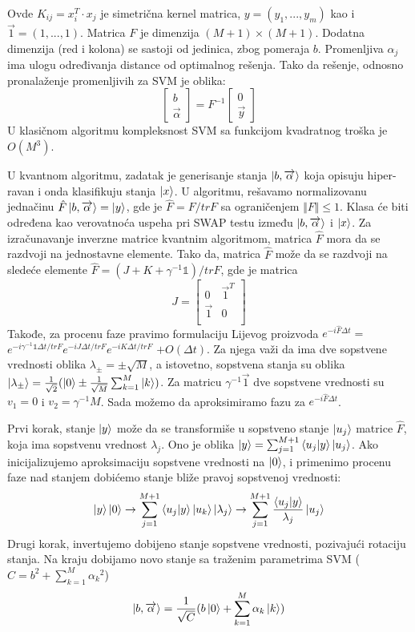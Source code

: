 \documentclass[12pt, letterpaper, oneside]{article}
\begin{document}
Ovde $K_{ij} = x_i^T \cdot x_j$ je simetrična kernel matrica, $y = (y_1,...,y_m)$ kao i
$\overrightarrow{1} = (1,...,1)$. Matrica $F$ je dimenzija $(M+1)\times(M+1)$. Dodatna dimenzija (red i kolona) se sastoji od jedinica,
zbog pomeraja $b$. Promenljiva $\alpha_j$ ima ulogu određivanja distance od optimalnog rešenja. Tako da rešenje, odnosno pronalaženje promenljivih za SVM je oblika:
\[
    \begin{bmatrix}
        b \\
        \overrightarrow{\alpha}
    \end{bmatrix} =
    F^{-1} \begin{bmatrix}
        0 \\
        \overrightarrow{y}
    \end{bmatrix}
\]
U klasičnom algoritmu kompleksnost SVM sa funkcijom kvadratnog troška je $O(M^3)$.

U kvantnom algoritmu, zadatak je generisanje stanja $\Ket{b,\overrightarrow{\alpha}}$ koja opisuju hiper-ravan i onda klasifikuju stanja
$\Ket{x}$. U algoritmu, rešavamo normalizovanu jednačinu $\hat{F}\Ket{b,\overrightarrow{\alpha}} = \Ket{y}$, gde je $\hat{F} = F/trF$ sa 
ograničenjem $\Vert F \Vert \leq 1$. Klasa će biti određena kao verovatnoća uspeha pri SWAP testu između $\Ket{b,\overrightarrow{\alpha}}$ i
$\Ket{x}$. Za izračunavanje inverzne matrice kvantnim algoritmom, matrica $\hat{F}$ mora da se razdvoji na jednostavne elemente.
Tako da, matrica $\hat{F}$ može da se razdvoji na sledeće elemente $\hat{F} = (J+K+\gamma^{-1}\mathbb{1})/trF$,
gde je matrica
\[
    J = \begin{bmatrix}
        0 & \overrightarrow{1}^T \\
        \overrightarrow{1} & 0 \\
    \end{bmatrix}
\]
Takođe, za procenu faze pravimo formulaciju Lijevog proizvoda 
$e^{-i\hat{F}\varDelta{t}} =$ $e^{-i\gamma^{-1}\mathbb{1}\varDelta{t}/trF}$$e^{-iJ\varDelta{t}/trF}$$e^{-iK\varDelta{t}/trF}$ $+ O(\varDelta{t})$.
Za njega važi da ima dve sopstvene vrednosti oblika $\lambda_{\pm} = \pm \sqrt{M}$, a istovetno, 
sopstvena stanja su oblika $\Ket{\lambda_{\pm}} = \frac{1}{\sqrt{2}}(\Ket{0} \pm \frac{1}{\sqrt{M}}\sum_{k=1}^M\Ket{k})$.
Za matricu $\gamma^{-1}\overrightarrow{1}$ dve sopstvene vrednosti su $v_1 = 0$ i $v_2 = \gamma^{-1}M$.
Sada možemo da aproksimiramo fazu za $e^{-i\hat{F}\varDelta{t}}$.

Prvi korak, stanje $\Ket{y}$ može da se transformiše u sopstveno stanje $\Ket{u_j}$ matrice $\hat{F}$, koja ima sopstvenu vrednost $\lambda_j$.
Ono je oblika $\Ket{y} = \sum_{j=1}^{M+1}\braket{u_j|y}\Ket{u_j}$. Ako inicijalizujemo aproksimaciju sopstvene vrednosti na $\Ket{0}$, i primenimo 
procenu faze nad stanjem dobićemo stanje bliže pravoj sopstvenoj vrednosti:
\[
  \Ket{y}\Ket{0} \to \sum_{j=1}^{M+1}\braket{u_j|y}\Ket{u_k}\Ket{\lambda_j} \to \sum_{j=1}^{M+1}\frac{\braket{u_j|y}}{\lambda_j}\Ket{u_j}
\]
Drugi korak, invertujemo dobijeno stanje sopstvene vrednosti, pozivajući rotaciju stanja. Na kraju dobijamo novo stanje sa traženim parametrima SVM ($C = b^2 + \sum_{k=1}^M{\alpha_k}^2$)
\[
    \Ket{b,\overrightarrow{\alpha}} = \frac{1}{\sqrt{C}}(b\Ket{0}+ \sum_{k=1}^M{\alpha_k \Ket{k}})
\]
\end{document}

